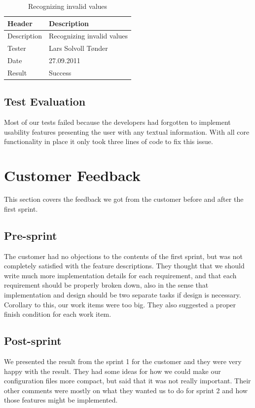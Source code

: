 \begin{table}[!htb] \footnotesize \center
\caption{Recognizing invalid values \label{tab:sp1_tid07}}
\begin{tabular}{l l}
	\toprule
	Header & Description \\
	\midrule
	Description &  Recognizing invalid values  \\
	Tester & Lars Solvoll Tønder \\
	Date & 27.09.2011 \\
	Result & Success\\
	\bottomrule
\end{tabular}
\end{table}

\subsection{Test Evaluation}
Most of our tests failed because the developers had forgotten to implement
usability features presenting the user with any textual information. With all
core functionality in place it only took three lines of code to fix this issue.


\section{Customer Feedback}
\label{sec:sp1:feedback}
This section covers the feedback we got from the customer before and after the first sprint.

\subsection{Pre-sprint}
The customer had no objections to the contents of the first sprint, but was not
completely satisfied with the feature descriptions. They thought that we should
write much more implementation details for each requirement, and that each
requirement should be properly broken down, also in the sense that
implementation and design should be two separate tasks if design is necessary.
Corollary to this, our work items were too big. They also suggested a proper
finish condition for each work item.

\subsection{Post-sprint}
We presented the result from the sprint 1 for the customer and they were very
happy with the result. They had some ideas for how we could make our
configuration files more compact, but said that it was not really important.
Their other comments were mostly on what they wanted us to do for sprint 2
and how those features might be implemented.



